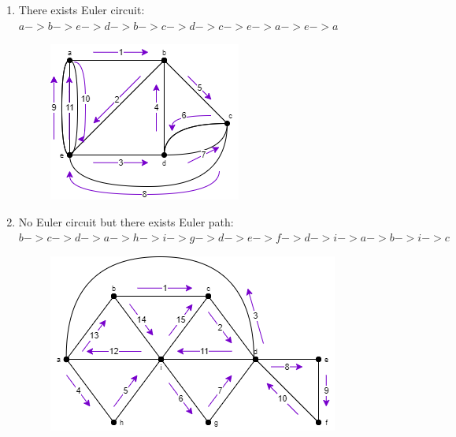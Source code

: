 \documentclass[a4paper]{article}
\begin{document}
\begin{enumerate}[label = \alph*)]
\begin{figure}[H]
		      \end{figure}
		\item There exists Euler circuit: $a -> b -> e -> d -> b -> c -> d -> c -> e -> a -> e ->a$
		      \begin{figure}[H]
			      \centering
			      \includegraphics[width= 0.4 \textwidth]{tut912_10.png}
		      \end{figure}
		\item No Euler circuit but there exists Euler path: $b -> c -> d -> a -> h -> i -> g -> d -> e -> f -> d -> i -> a -> b -> i -> c$
		      \begin{figure}[H]
			      \centering
			      \includegraphics[width= 0.5 \textwidth]{tut912_11.png}
		      \end{figure}
	\end{enumerate}
\end{document}
